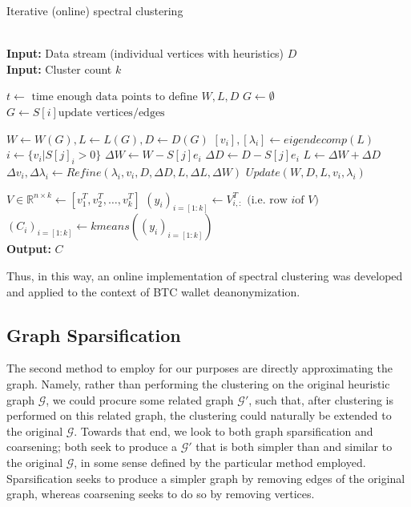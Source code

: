 \documentclass[journal]{IEEEtran}
\begin{document}
\begin{algorithm}
\caption{Iterative (online) spectral clustering \cite{incremental}}\label{alg:spectral-iterative}
\begin{algorithmic}[1]
 \\
\textbf{Input:} Data stream (individual vertices with heuristics) $D$ \\
\textbf{Input:} Cluster count $k$

\State $t \gets\text{ time enough data points to define } W, L, D$
\State $G \gets \emptyset$
    \State $G \gets S[i] \text{update vertices/edges}$
\EndFor

\State $W\gets W(G), L\gets L(G), D\gets D(G)$
\State $[v_i], [\lambda_i] \gets eigendecomp(L)$
    \State $i \gets \{v_i|S[j]_i > 0\}$
    \State $\Delta W\gets W - S[j] e_i$
    \State $\Delta D\gets D - S[j] e_i$
    \State $L\gets \Delta W + \Delta D$
    \State $\Delta v_i, \Delta \lambda_i \gets Refine(\lambda_i, v_i, D, \Delta D, L, \Delta L, \Delta W)$
    \State $Update(W,D,L,v_i,\lambda_i)$
\EndWhile

\State $V\in\mathbb{R}^{n\times k} \gets [v_1^T, v_2^T,\dots,v_k^T]$
\State $(y_i)_{i=[1:k]} \gets V^T_{i,:} \text{ (i.e. row } i \text{of } V\text{)}$
\State $(C_i)_{i=[1:k]} \gets kmeans((y_i)_{i=[1:k]})$ \\

\textbf{Output:} $C$
\EndProcedure
\end{algorithmic}
\end{algorithm}

Thus, in this way, an online implementation of spectral clustering was developed and applied to the context of BTC wallet deanonymization.

\subsection{Graph Sparsification}
The second method to employ for our purposes are directly approximating the graph. Namely, rather than performing the clustering on the original heuristic graph $\mathcal{G}$, we could procure some related graph $\mathcal{G}'$, such that, after clustering is performed on this related graph, the clustering could naturally be extended to the original $\mathcal{G}$. Towards that end, we look to both graph sparsification and coarsening; both seek to produce a $\mathcal{G}'$ that is both simpler than and similar to the original $\mathcal{G}$, in some sense defined by the particular method employed. Sparsification seeks to produce a simpler graph by removing edges of the original graph, whereas coarsening seeks to do so by removing vertices.
\end{document}
